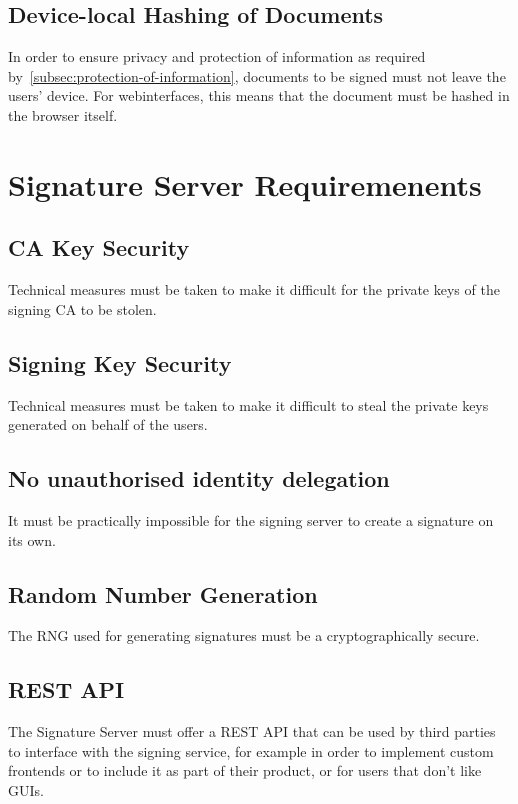 \subsection{Device-local Hashing of Documents}\label{subsec:local-hashing-of-documents}
In order to ensure privacy and protection of information as required by~\ref{subsec:protection-of-information},
documents to be signed must not leave the users' device.
For webinterfaces, this means that the document must be hashed in the browser itself.

\section{Signature Server Requiremenents}
\label{sec:signatureserverrequirements}
\subsection{CA Key Security}\label{subsec:ca-key-security}
Technical measures must be taken to make it difficult for the private keys of the signing \gls{CA} to be stolen.

\subsection{Signing Key Security}\label{subsec:signing-key-security}
Technical measures must be taken to make it difficult to steal the private keys generated on behalf of the users.

\subsection{No unauthorised identity delegation}\label{subsec:no-unauthorised-identity-delegation}
It must be practically impossible for the signing server to create a signature on its own.

\subsection{Random Number Generation}\label{subsec:random-number-generation}
The \gls{RNG} used for generating signatures must be a cryptographically secure.

\subsection{REST API}\label{subsec:rest-api}
The Signature Server must offer a \gls{REST} \gls{API} that can be used by third parties to interface with the signing service,
for example in order to implement custom frontends or to include it as part of their product,
or for users that don't like \gls{GUI}s.

